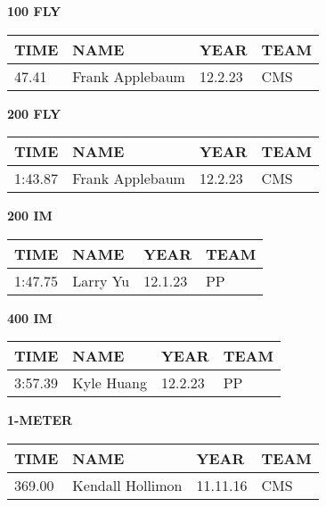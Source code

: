\begin{minipage}[t]{0.48\textwidth}
\centering
\textbf{100 FLY}\\[0.05cm]
\begin{tabular}{@{}p{1.8cm}p{2.8cm}p{1.2cm}p{1.4cm}@{}}
\hline
\textbf{TIME} & \textbf{NAME} & \textbf{YEAR} & \textbf{TEAM} \\
\hline
47.41 & Frank Applebaum & 12.2.23 & CMS \\
\hline
\end{tabular}
\end{minipage}\hfill
\begin{minipage}[t]{0.48\textwidth}
\centering
\textbf{200 FLY}\\[0.05cm]
\begin{tabular}{@{}p{1.8cm}p{2.8cm}p{1.2cm}p{1.4cm}@{}}
\hline
\textbf{TIME} & \textbf{NAME} & \textbf{YEAR} & \textbf{TEAM} \\
\hline
1:43.87 & Frank Applebaum & 12.2.23 & CMS \\
\hline
\end{tabular}
\end{minipage}

\vspace{0.4cm}

\begin{minipage}[t]{0.48\textwidth}
\centering
\textbf{200 IM}\\[0.05cm]
\begin{tabular}{@{}p{1.8cm}p{2.8cm}p{1.2cm}p{1.4cm}@{}}
\hline
\textbf{TIME} & \textbf{NAME} & \textbf{YEAR} & \textbf{TEAM} \\
\hline
1:47.75 & Larry Yu & 12.1.23 & PP \\
\hline
\end{tabular}
\end{minipage}\hfill
\begin{minipage}[t]{0.48\textwidth}
\centering
\textbf{400 IM}\\[0.05cm]
\begin{tabular}{@{}p{1.8cm}p{2.8cm}p{1.2cm}p{1.4cm}@{}}
\hline
\textbf{TIME} & \textbf{NAME} & \textbf{YEAR} & \textbf{TEAM} \\
\hline
3:57.39 & Kyle Huang & 12.2.23 & PP \\
\hline
\end{tabular}
\end{minipage}

\vspace{0.4cm}

\begin{center}
\begin{minipage}[t]{0.7\textwidth}
\centering
\textbf{1-METER}\\[0.05cm]
\begin{tabular}{@{}p{1.8cm}p{2.8cm}p{1.2cm}p{1.4cm}@{}}
\hline
\textbf{TIME} & \textbf{NAME} & \textbf{YEAR} & \textbf{TEAM} \\
\hline
369.00 & Kendall Hollimon & 11.11.16 & CMS \\
\hline
\end{tabular}
\end{minipage}
\end{center}

